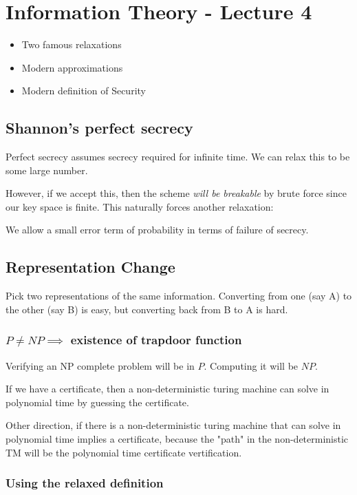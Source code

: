 \section{Information Theory - Lecture 4}

\begin{itemize}
    \item Two famous relaxations
    \item Modern approximations
    \item Modern definition of Security
\end{itemize}

\subsection{Shannon's perfect secrecy}
Perfect secrecy assumes secrecy required for infinite time. We can relax 
this to be some large number.

However, if we accept this, then the scheme \textit{will be breakable} by brute force
since our key space is finite. This naturally forces another relaxation:

We allow a small error term of probability in terms of failure of secrecy.



\subsection{Representation Change}

Pick two representations of the same information. Converting from one (say A)
to the other (say B) is easy, but converting back from B to A is hard.

\subsubsection{$P \neq NP \implies$ existence of trapdoor function}

Verifying an NP complete problem will be in $P$. Computing it will be $NP$.


If we have a certificate, then a non-deterministic turing machine can solve in
polynomial time by guessing the certificate.

Other direction, if there is a non-deterministic turing machine that can solve
in polynomial time implies a certificate, because the "path" in the
non-deterministic TM will be the polynomial time certificate vertification.

\subsubsection{Using the relaxed definition}

